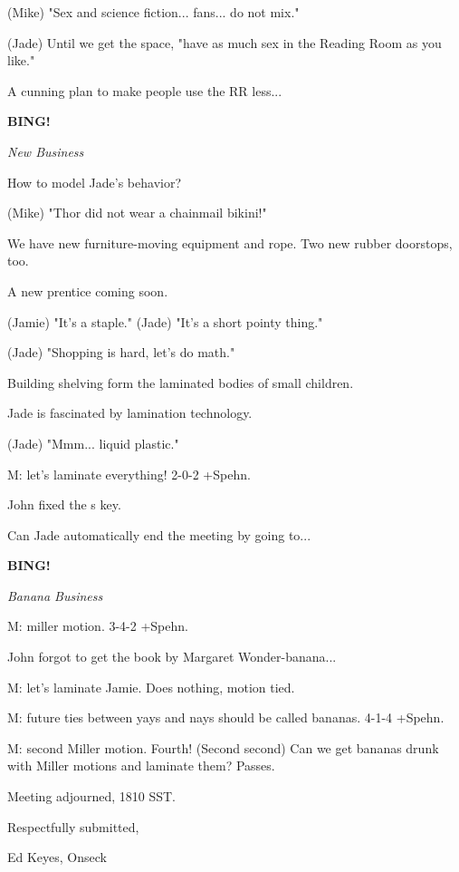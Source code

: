 \documentclass[12pt]{article}
\newcommand{\bing}{{\bf BING!} }
\newcommand{\goto}[1]{\bing \vskip 12pt \centerline{{\em{#1}}}}
\begin{document}
(Mike) "Sex and science fiction... fans... do not mix."

(Jade) Until we get the space, "have as much sex in the Reading Room as you like."

A cunning plan to make people use the RR less...

\goto{New Business}

How to model Jade's behavior?

(Mike) "Thor did not wear a chainmail bikini!"

We have new furniture-moving equipment and rope. Two new rubber doorstops, too.

A new prentice coming soon.

(Jamie) "It's a staple." (Jade) "It's a short pointy thing."

(Jade) "Shopping is hard, let's do math."

Building shelving form the laminated bodies of small children.

Jade is fascinated by lamination technology.

(Jade) "Mmm... liquid plastic."

M: let's laminate everything! 2-0-2 +Spehn.

John fixed the s key.

Can Jade automatically end the meeting by going to...

\goto{Banana Business}

M: miller motion. 3-4-2 +Spehn.

John forgot to get the book by Margaret Wonder-banana...

M: let's laminate Jamie. Does nothing, motion tied.

M: future ties between yays and nays should be called bananas. 4-1-4 +Spehn.

M: second Miller motion. Fourth! (Second second) Can we get bananas drunk with Miller motions and laminate them? Passes.

\vspace{12pt}

\noindent
Meeting adjourned, 1810 SST.

\vspace{18pt}

\centerline{Respectfully submitted,}
\centerline{Ed Keyes, Onseck}
\end{document}
